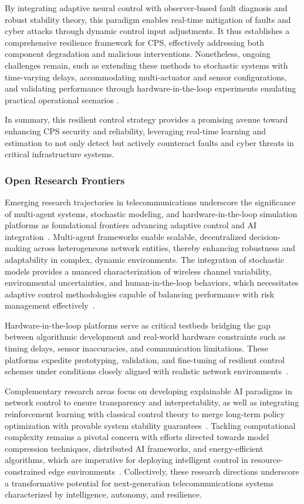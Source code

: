 \documentclass[sigconf]{acmart}
\begin{document}
By integrating adaptive neural control with observer-based fault diagnosis and robust stability theory, this paradigm enables real-time mitigation of faults and cyber attacks through dynamic control input adjustments. It thus establishes a comprehensive resilience framework for CPS, effectively addressing both component degradation and malicious interventions. Nonetheless, ongoing challenges remain, such as extending these methods to stochastic systems with time-varying delays, accommodating multi-actuator and sensor configurations, and validating performance through hardware-in-the-loop experiments emulating practical operational scenarios \cite{ref46}.

In summary, this resilient control strategy provides a promising avenue toward enhancing CPS security and reliability, leveraging real-time learning and estimation to not only detect but actively counteract faults and cyber threats in critical infrastructure systems.

\subsubsection{Open Research Frontiers}

Emerging research trajectories in telecommunications underscore the significance of multi-agent systems, stochastic modeling, and hardware-in-the-loop simulation platforms as foundational frontiers advancing adaptive control and AI integration~\cite{ref46}. Multi-agent frameworks enable scalable, decentralized decision-making across heterogeneous network entities, thereby enhancing robustness and adaptability in complex, dynamic environments. The integration of stochastic models provides a nuanced characterization of wireless channel variability, environmental uncertainties, and human-in-the-loop behaviors, which necessitates adaptive control methodologies capable of balancing performance with risk management effectively~\cite{ref46}.

Hardware-in-the-loop platforms serve as critical testbeds bridging the gap between algorithmic development and real-world hardware constraints such as timing delays, sensor inaccuracies, and communication limitations. These platforms expedite prototyping, validation, and fine-tuning of resilient control schemes under conditions closely aligned with realistic network environments~\cite{ref46}.

Complementary research areas focus on developing explainable AI paradigms in network control to ensure transparency and interpretability, as well as integrating reinforcement learning with classical control theory to merge long-term policy optimization with provable system stability guarantees~\cite{ref50}. Tackling computational complexity remains a pivotal concern with efforts directed towards model compression techniques, distributed AI frameworks, and energy-efficient algorithms, which are imperative for deploying intelligent control in resource-constrained edge environments~\cite{ref49}. Collectively, these research directions underscore a transformative potential for next-generation telecommunications systems characterized by intelligence, autonomy, and resilience.
\end{document}
